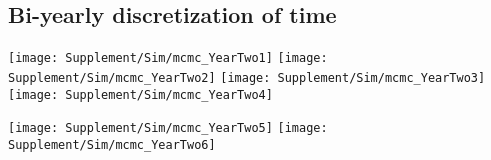 \documentclass{article}
\begin{document}
\subsection*{Bi-yearly discretization of time}
\begin{center}
    \texttt{[image: Supplement/Sim/mcmc\_YearTwo1]}
    \texttt{[image: Supplement/Sim/mcmc\_YearTwo2]}
        \texttt{[image: Supplement/Sim/mcmc\_YearTwo3]}
            \texttt{[image: Supplement/Sim/mcmc\_YearTwo4]}
\end{center}
\begin{center}
    \texttt{[image: Supplement/Sim/mcmc\_YearTwo5]}
    \texttt{[image: Supplement/Sim/mcmc\_YearTwo6]}
\end{center}
\end{document}
